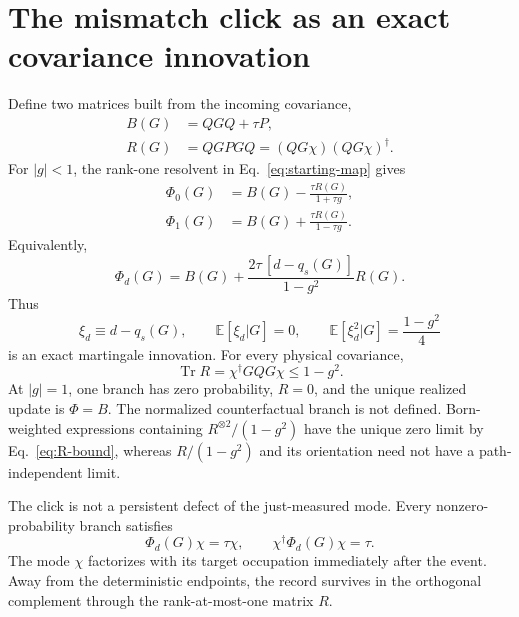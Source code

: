 \documentclass[
  aps,prx,twocolumn,superscriptaddress,longbibliography,
  nofootinbib,floatfix
]{revtex4-2}
\newcommand{\Tr}{\operatorname{Tr}}
\newcommand{\E}{\mathbb{E}}
\theoremstyle{plain}
\theoremstyle{definition}
\begin{document}
\section{The mismatch click as an exact covariance innovation}
\label{sec:innovation}

Define two matrices built from the incoming covariance,
\begin{align}
 B(G)&=QGQ+\tau P,
 \nonumber\\
 R(G)&=QGPGQ=(QG\chi)(QG\chi)^\dagger.
 \label{eq:B-R-definitions}
\end{align}
For \(|g|<1\), the rank-one resolvent in
Eq.~\eqref{eq:starting-map} gives
\begin{align}
 \Phi_0(G)&=B(G)-\frac{\tau R(G)}{1+\tau g},
 \nonumber\\
 \Phi_1(G)&=B(G)+\frac{\tau R(G)}{1-\tau g}.
 \label{eq:two-defect-branches}
\end{align}
Equivalently,
\begin{equation}
 \boxed{
 \Phi_d(G)=B(G)
 +\frac{2\tau\,[d-q_s(G)]}{1-g^2}R(G).}
 \label{eq:innovation-map}
\end{equation}
Thus
\begin{equation}
 \xi_d\equiv d-q_s(G),
 \qquad
 \E[\xi_d|G]=0,
 \qquad
 \E[\xi_d^2|G]=\frac{1-g^2}{4}
 \label{eq:martingale-innovation}
\end{equation}
is an exact martingale innovation.  For every physical covariance,
\begin{equation}
 \Tr R=\chi^\dagger GQG\chi\leq1-g^2.
 \label{eq:R-bound}
\end{equation}
At \(|g|=1\), one branch has zero probability, \(R=0\), and the unique
realized update is \(\Phi=B\).  The normalized counterfactual branch is not
defined.  Born-weighted expressions containing
\(R^{\otimes2}/(1-g^2)\) have the unique zero limit by
Eq.~\eqref{eq:R-bound}, whereas \(R/(1-g^2)\) and its orientation need not
have a path-independent limit.

The click is not a persistent defect of the just-measured mode.  Every
nonzero-probability branch satisfies
\begin{equation}
 \Phi_d(G)\chi=\tau\chi,
 \qquad
 \chi^\dagger\Phi_d(G)\chi=\tau.
 \label{eq:measured-mode-healed}
\end{equation}
The mode \(\chi\) factorizes with its target occupation immediately after the
event.  Away from the deterministic endpoints, the record survives in the
orthogonal complement through the rank-at-most-one matrix \(R\).
\end{document}

